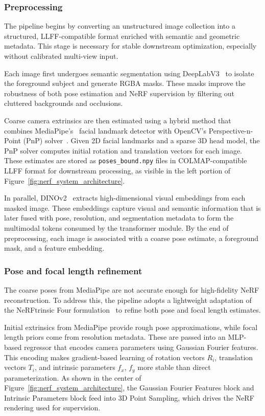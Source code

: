 \documentclass[9pt,openany]{extbook}
\begin{document}
\subsubsection{Preprocessing}

The pipeline begins by converting an unstructured image collection into a structured, LLFF-compatible format enriched with semantic and geometric metadata. This stage is necessary for stable downstream optimization, especially without calibrated multi-view input.

Each image first undergoes semantic segmentation using DeepLabV3~\cite{chen2018deeplabv3} to isolate the foreground subject and generate RGBA masks. These masks improve the robustness of both pose estimation and NeRF supervision by filtering out cluttered backgrounds and occlusions.

Coarse camera extrinsics are then estimated using a hybrid method that combines MediaPipe's~\cite{mediapipe2023} facial landmark detector with OpenCV's Perspective-n-Point (PnP) solver~\cite{opencv_solvepnp}. Given 2D facial landmarks and a sparse 3D head model, the PnP solver computes initial rotation and translation vectors for each image. These estimates are stored as \texttt{poses\_bound.npy} files in COLMAP-compatible LLFF format for downstream processing, as visible in the left portion of Figure~\ref{fig:nerf_system_architecture}.

In parallel, DINOv2~\cite{dinov2_2023} extracts high-dimensional visual embeddings from each masked image. These embeddings capture visual and semantic information that is later fused with pose, resolution, and segmentation metadata to form the multimodal tokens consumed by the transformer module. By the end of preprocessing, each image is associated with a coarse pose estimate, a foreground mask, and a feature embedding.


\subsubsection{Pose and focal length refinement}
\label{sec:nerftrinsic_refinement}

The coarse poses from MediaPipe are not accurate enough for high-fidelity NeRF reconstruction. To address this, the pipeline adopts a lightweight adaptation of the NeRFtrinsic Four formulation~\cite{lin2023nerftrinsic} to refine both pose and focal length estimates.

Initial extrinsics from MediaPipe provide rough pose approximations, while focal length priors come from resolution metadata. These are passed into an MLP-based regressor that encodes camera parameters using Gaussian Fourier features. This encoding makes gradient-based learning of rotation vectors $R_i$, translation vectors $T_i$, and intrinsic parameters $f_x$, $f_y$ more stable than direct parameterization. As shown in the center of Figure~\ref{fig:nerf_system_architecture}, the Gaussian Fourier Features block and Intrinsic Parameters block feed into 3D Point Sampling, which drives the NeRF rendering used for supervision.
\end{document}
